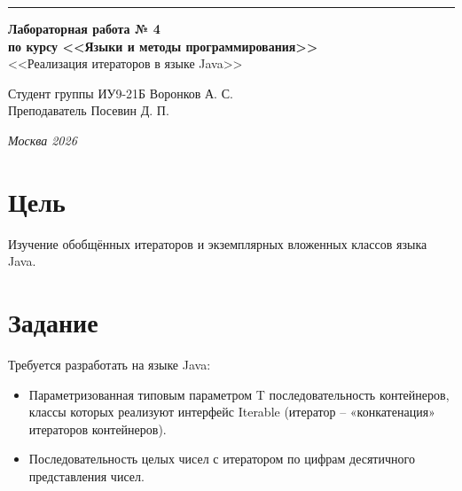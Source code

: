 \documentclass[a4paper, 14pt]{extarticle}
\begin{document}
\begin{titlepage}
\vspace*{-16pt}
\hspace{30pt}\rule{0.866\textwidth}{0.4pt}
  
\vspace{11em}

\begin{center}
\Large {\bf Лабораторная работа № 4} \\ 
\large {\bf по курсу <<Языки и методы программирования>>} \\ 
\large <<Реализация итераторов в языке Java>>
\end{center}\normalsize

\vspace{8em}


\begin{flushright}
  {Студент группы ИУ9-21Б Воронков А. С.\hspace*{15pt} \\
  \vspace{2ex}
  Преподаватель Посевин Д. П.\hspace*{15pt}}
\end{flushright}

\bigskip

\vfill
 

\begin{center}
\textsl{Москва 2026}
\end{center}
\end{titlepage}

\renewcommand{\ttdefault}{pcr}

\setlength{\tabcolsep}{3pt}
\newpage
\setcounter{page}{2}

\section{Цель}\label{Sect::task}
\par 
Изучение обобщённых итераторов и экземплярных вложенных классов языка Java.  
\section{Задание}
Требуется разработать на языке Java:
\begin{itemize}
    \item Параметризованная типовым параметром T последовательность контейнеров, классы которых реализуют интерфейс Iterable (итератор – «конкатенация» итераторов контейнеров). 
    \item Последовательность целых чисел с итератором по цифрам десятичного представления чисел. 

\end{itemize}
\end{document}
